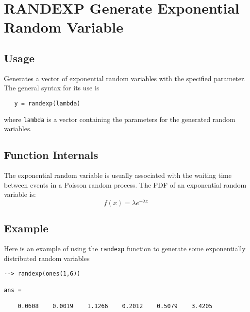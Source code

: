 \section{RANDEXP Generate Exponential Random Variable}

\subsection{Usage}

Generates a vector of exponential random variables with
the specified parameter.  The general syntax for its use is
\begin{verbatim}
   y = randexp(lambda)
\end{verbatim}
where \verb|lambda| is a vector containing the parameters for
the generated random variables.
\subsection{Function Internals}

The exponential random variable is usually associated with
the waiting time between events in a Poisson random process.
The PDF of an exponential random variable is:
\[
   f(x) = \lambda e^{-\lambda x}
\]
\subsection{Example}

Here is an example of using the \verb|randexp| function to generate
some exponentially distributed random variables
\begin{verbatim}
--> randexp(ones(1,6))

ans = 

    0.0608    0.0019    1.1266    0.2012    0.5079    3.4205 
\end{verbatim}
